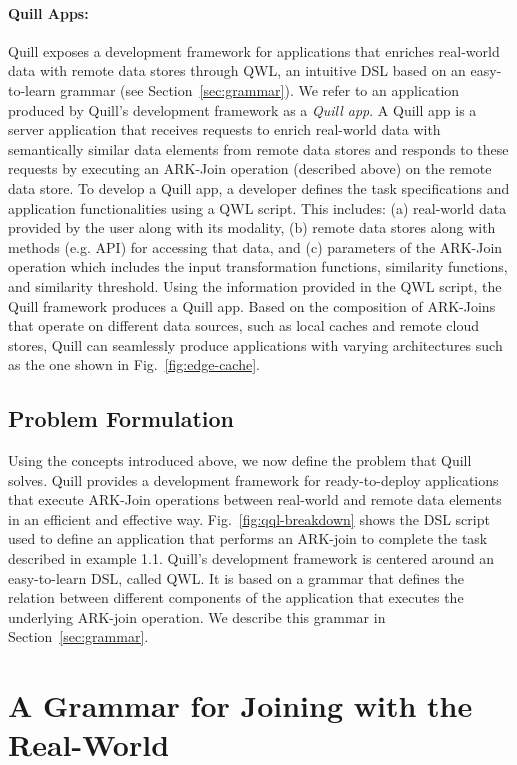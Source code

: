 \documentclass[11pt]{article}
\begin{document}
\paragraph{Quill Apps:}
\label{sec:background:app}
Quill exposes a development framework for applications that enriches real-world data with remote data stores through QWL, an intuitive DSL based on an easy-to-learn grammar (see Section~\ref{sec:grammar}).
We refer to an application produced by Quill's development framework as a \textit{Quill app}. A Quill app is a server application that receives requests to enrich real-world data with semantically similar data elements from remote data stores and responds to these requests by executing an ARK-Join operation (described above) on the remote data store. To develop a Quill app, a developer defines the task specifications and application functionalities using a QWL script. This includes: (a) real-world data provided by the user along with its modality, (b) remote data stores along with methods (e.g. API) for accessing that data, and (c) parameters of the ARK-Join operation which includes the input transformation functions, similarity functions, and similarity threshold. Using the information provided in the QWL script, the Quill framework produces a Quill app.
Based on the composition of ARK-Joins that operate on different data sources, such as local caches and remote cloud stores, Quill can seamlessly produce applications with varying architectures such as the one shown in Fig.~\ref{fig:edge-cache}.

\subsection{Problem Formulation}
Using the concepts introduced above, we now define the problem that Quill solves. Quill provides a development framework for ready-to-deploy applications that execute ARK-Join operations between real-world and remote data elements in an efficient and effective way. Fig.~\ref{fig:qql-breakdown} shows the DSL script used to define an application that performs an ARK-join to complete the task described in example 1.1. Quill's development framework is centered around an easy-to-learn DSL, called QWL. It is based on a grammar that defines the relation between different components of the application that executes the underlying ARK-join operation. We describe this grammar in Section~\ref{sec:grammar}.



\section{A Grammar for Joining with the Real-World}\label{sec:design:spec}
\label{sec:grammar}
\end{document}
